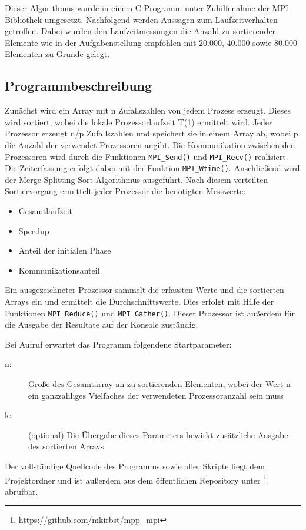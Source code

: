 \documentclass[a4paper,12pt]{scrartcl}
\begin{document}
Dieser Algorithmus wurde in einem C-Programm unter Zuhilfenahme der MPI Bibliothek umgesetzt.
Nachfolgend werden Aussagen zum Laufzeitverhalten getroffen. Dabei wurden den Laufzeitmessungen die Anzahl zu sortierender Elemente wie in der Aufgabenstellung
empfohlen mit 20.000, 40.000 sowie 80.000 Elementen zu Grunde gelegt.

\subsection{Programmbeschreibung}
Zun\"achst wird ein Array mit n Zufallszahlen von jedem Prozess erzeugt. Dieses wird sortiert, wobei die lokale Prozessorlaufzeit T(1) ermittelt wird. Jeder
Prozessor erzeugt n/p Zufallszahlen und speichert sie in einem Array ab, wobei p die Anzahl der verwendet Prozessoren angibt. Die Kommunikation zwischen den
Prozessoren wird durch die Funktionen \texttt{MPI\_Send()} und \texttt{MPI\_Recv()} realisiert. Die Zeiterfassung erfolgt dabei mit der
Funktion \texttt{MPI\_Wtime()}. Anschlie\ss{}end wird der Merge-Splitting-Sort-Algorithmus ausgef\"uhrt. Nach diesem verteilten Sortiervorgang ermittelt jeder
Prozessor die ben\"otigten Messwerte:
\begin{itemize}
 \item Gesamtlaufzeit
 \item Speedup
 \item Anteil der initialen Phase
 \item Kommunikationsanteil
\end{itemize}
Ein ausgezeichneter Prozessor sammelt die erfassten Werte und die sortierten Arrays ein und ermittelt die Durchschnittswerte. Dies erfolgt mit Hilfe der
Funktionen \texttt{MPI\_Reduce()} und \texttt{MPI\_Gather()}. Dieser Prozessor ist au\ss{}erdem f\"ur die Ausgabe der Resultate auf der Konsole zust\"andig.

Bei Aufruf erwartet das Programm folgendene Startparameter:
\begin{description}
 \item [n:]  Gr\"o\ss{}e des Gesamtarray an zu sortierenden Elementen, wobei der Wert n ein ganzzahliges Vielfaches der verwendeten
Prozessoranzahl sein muss
 \item [k:]  (optional) Die \"Ubergabe dieses Parameters bewirkt zus\"atzliche Ausgabe des sortierten Arrays
\end{description}

Der vollst\"andige Quellcode des Programms sowie aller Skripte liegt dem Projektordner und ist au\ss{}erdem aus dem \"offentlichen Repository unter
\footnote{\url{https://github.com/mkirbst/mpp_mpi}} abrufbar.
\end{document}
